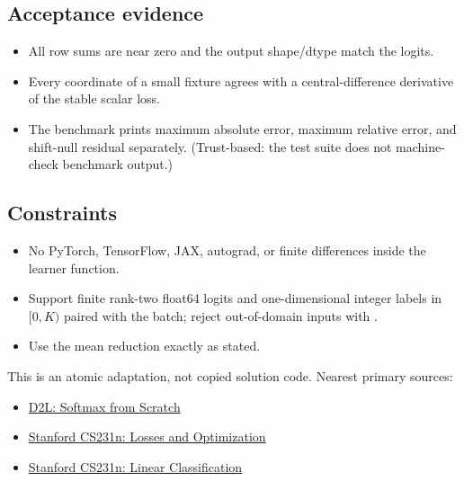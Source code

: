         \subsection{Acceptance evidence}

        \begin{evidencebox}
        \begin{itemize}
          \item All row sums are near zero and the output shape/dtype match the logits.
  \item Every coordinate of a small fixture agrees with a central-difference derivative of the stable scalar loss.
  \item The benchmark prints maximum absolute error, maximum relative error, and shift-null residual separately. (Trust-based: the test suite does not machine-check benchmark output.)
        \end{itemize}
        \end{evidencebox}

        \subsection{Constraints}

        \begin{itemize}
          \item No PyTorch, TensorFlow, JAX, autograd, or finite differences inside the learner function.
  \item Support finite rank-two float64 logits and one-dimensional integer labels in $[0,K)$ paired with the batch; reject out-of-domain inputs with .
  \item Use the mean reduction exactly as stated.
        \end{itemize}

        \begin{sourcebox}
        This is an atomic adaptation, not copied solution code. Nearest primary sources:
        \begin{itemize}
          \item \href{https://d2l.ai/chapter_linear-classification/softmax-regression-scratch.html}{D2L: Softmax from Scratch}
  \item \href{https://cs231n.github.io/optimization-1/}{Stanford CS231n: Losses and Optimization}
  \item \href{https://cs231n.github.io/linear-classify/}{Stanford CS231n: Linear Classification}
        \end{itemize}
        \end{sourcebox}
